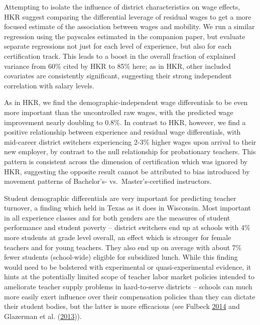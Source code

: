 \documentclass[]{article}
\begin{document}
Attempting to isolate the influence of district characteristics on wage
effects, HKR suggest comparing the differential leverage of residual
wages to get a more focused estimate of the association between wages
and mobility. We run a similar regression using the payscales estimated
in the companion paper, but evaluate separate regressions not just for
each level of experience, but also for each certification track. This
leads to a boost in the overall fraction of explained variance from 60\%
cited by HKR to 85\% here; as in HKR, other included covariates are
consistently significant, suggesting their strong independent
correlation with salary levels.

As in HKR, we find the demographic-independent wage differentials to be
even more important than the uncontrolled raw wages, with the predicted
wage improvement nearly doubling to 0.8\%. In contrast to HKR, however,
we find a positive relationship between experience and residual wage
differentials, with mid-career district switchers experiencing 2-3\%
higher wages upon arrival to their new employer, by contrast to the null
relationship for probationary teachers. This pattern is consistent
across the dimension of certification which was ignored by HKR,
suggesting the opposite result cannot be attributed to bias introduced
by movement patterns of Bachelor's- vs.~Master's-certified instructors.

Student demographic differentials are very important for predicting
teacher turnover, a finding which held in Texas as it does in Wisconsin.
Most important in all experience classes and for both genders are the
measures of student performance and student poverty -- district
switchers end up at schools with 4\% more students at grade level
overall, an effect which is stronger for female teachers and for young
teachers. They also end up on average with about 7\% fewer students
(school-wide) eligible for subsidized lunch. While this finding would
need to be bolstered with experimental or quasi-experimental evidence,
it hints at the potentially limited scope of teacher labor market
policies intended to ameliorate teacher supply problems in hard-to-serve
districts -- schools can much more easily exert influence over their
compensation policies than they can dictate their student bodies, but
the latter is more efficacious (see Fulbeck
\protect\hyperlink{ref-fulbeck}{2014} and Glazerman et al.
(\protect\hyperlink{ref-glazerman}{2013})).
\end{document}

